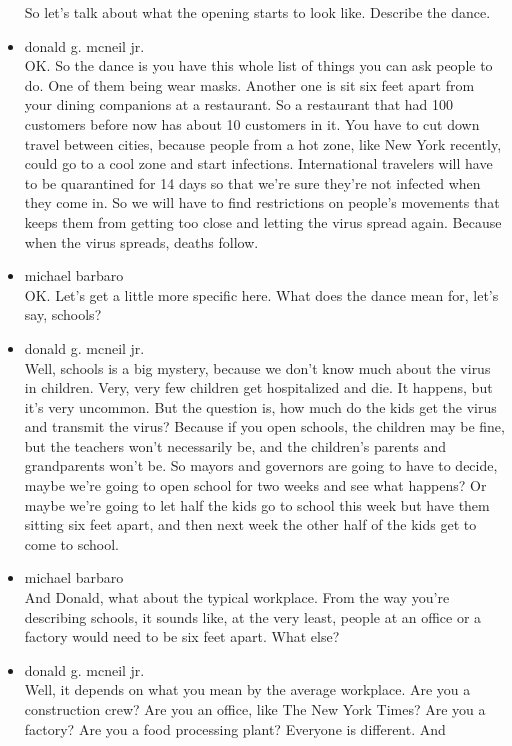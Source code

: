\begin{itemize}
  So let's talk about what the opening starts to look like. Describe the
  dance.
\item
  donald g. mcneil jr.\\
  OK. So the dance is you have this whole list of things you can ask
  people to do. One of them being wear masks. Another one is sit six
  feet apart from your dining companions at a restaurant. So a
  restaurant that had 100 customers before now has about 10 customers in
  it. You have to cut down travel between cities, because people from a
  hot zone, like New York recently, could go to a cool zone and start
  infections. International travelers will have to be quarantined for 14
  days so that we're sure they're not infected when they come in. So we
  will have to find restrictions on people's movements that keeps them
  from getting too close and letting the virus spread again. Because
  when the virus spreads, deaths follow.
\item
  michael barbaro\\
  OK. Let's get a little more specific here. What does the dance mean
  for, let's say, schools?
\item
  donald g. mcneil jr.\\
  Well, schools is a big mystery, because we don't know much about the
  virus in children. Very, very few children get hospitalized and die.
  It happens, but it's very uncommon. But the question is, how much do
  the kids get the virus and transmit the virus? Because if you open
  schools, the children may be fine, but the teachers won't necessarily
  be, and the children's parents and grandparents won't be. So mayors
  and governors are going to have to decide, maybe we're going to open
  school for two weeks and see what happens? Or maybe we're going to let
  half the kids go to school this week but have them sitting six feet
  apart, and then next week the other half of the kids get to come to
  school.
\item
  michael barbaro\\
  And Donald, what about the typical workplace. From the way you're
  describing schools, it sounds like, at the very least, people at an
  office or a factory would need to be six feet apart. What else?
\item
  donald g. mcneil jr.\\
  Well, it depends on what you mean by the average workplace. Are you a
  construction crew? Are you an office, like The New York Times? Are you
  a factory? Are you a food processing plant? Everyone is different. And

\end{itemize}
